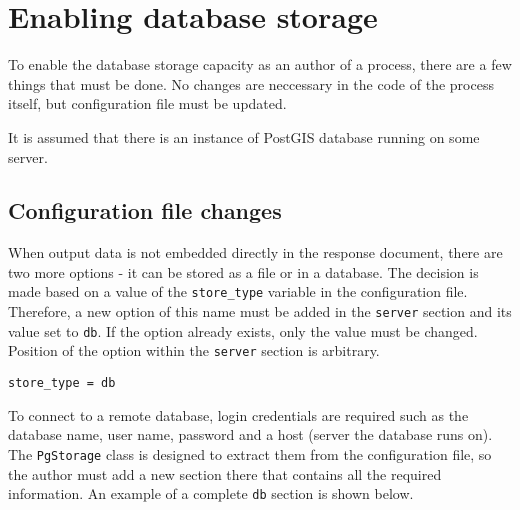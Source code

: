 \chapter{Enabling database storage} \label{appendix}
\label{Enabling-database-storage}

To enable the database storage capacity as an author of a process,
there are a few things that must be done. No changes are neccessary in
the code of the process itself, but configuration file must be
updated.

It is assumed that there is an instance of PostGIS database running on some server.


\section{Configuration file changes} \label{cfgchanges}

When output data is not embedded directly in the response document,
there are two more options - it can be stored as a file or in a
database. The decision is made based on a value of the \texttt{store\_type} 
variable in the configuration file. Therefore, a new option of this name
must be added in the \texttt{server} section and its value set to 
\texttt{db}. If the option already exists, only the value must be changed. 
Position of the option within the \texttt{server} section is arbitrary.

\begin{verbatim}
store_type = db
\end{verbatim}



To connect to a remote database, login credentials are
required such as the database name, user name, password and a host
(server the database runs on). The \texttt{PgStorage} class is designed
to extract them from the configuration file, so the author must add a
new section there that contains all the required information. An
example of a complete \texttt{db} section is shown below.

